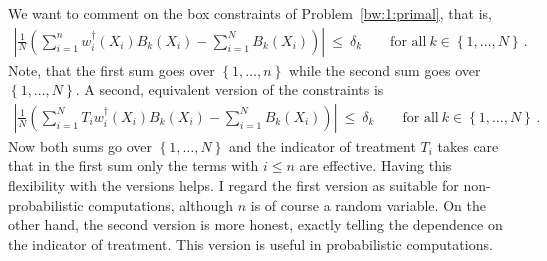 \begin{remark}
  We want to comment on the box constraints of Problem~\ref{bw:1:primal}, that is,
 \begin{gather*}
      \left| 
      \frac{1}{N} 
      \left( 
      \sum_{i = 1}^{n} 
      w^\dagger_i(X_i)
      B_k(X_i)
      -
      \sum_{i=1}^{N} 
      B_k(X_i)
      \right)
    \right|
    \ 
    \le 
    \ 
    \delta_k
    \qquad
    \text{for all}\ 
    k \in \left\{ 1, \ldots, N \right\}
    \,.
  \end{gather*}
  Note, that the first sum goes over $\left\{ 1,\ldots,n \right\}$ while the second sum goes over $\left\{ 1,\ldots,N \right\}$.
  A second, equivalent version of the constraints is
  \begin{gather*}
      \left| 
      \frac{1}{N} 
      \left( 
      \sum_{i = 1}^{N} 
      T_i
      w^\dagger_i(X_i)
      B_k(X_i)
      -
      \sum_{i=1}^{N} 
      B_k(X_i)
      \right)
    \right|
    \ 
    \le 
    \ 
    \delta_k
    \qquad
    \text{for all}\ 
    k \in \left\{ 1, \ldots, N \right\}
    \,.
  \end{gather*}
  Now both sums go over $\left\{ 1,\ldots,N \right\}$ and the
  indicator of treatment $T_i$ takes care that in the first sum only the terms with $i\le n$ are effective. 
  Having this flexibility with the versions helps. I regard the first version as suitable for non-probabilistic computations, although $n$ is of course a random variable. On the other hand, the second version is more honest, exactly telling the dependence on the indicator of treatment. This version is useful in probabilistic computations. 


\end{remark}
